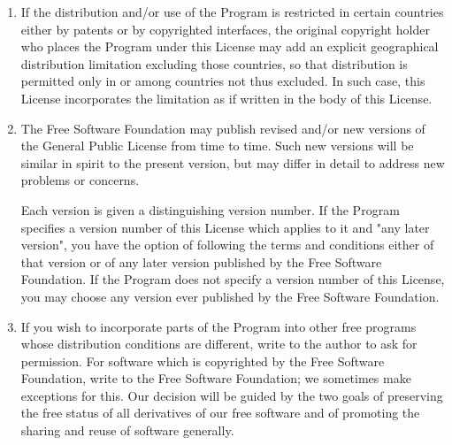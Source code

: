 {\begin{enumerate}
If any portion of this section is held invalid or unenforceable under
any particular circumstance, the balance of the section is intended to
apply and the section as a whole is intended to apply in other
circumstances.

It is not the purpose of this section to induce you to infringe any
patents or other property right claims or to contest validity of any
such claims; this section has the sole purpose of protecting the
integrity of the free software distribution system, which is
implemented by public license practices.  Many people have made
generous contributions to the wide range of software distributed
through that system in reliance on consistent application of that
system; it is up to the author/donor to decide if he or she is willing
to distribute software through any other system and a licensee cannot
impose that choice.

This section is intended to make thoroughly clear what is believed to
be a consequence of the rest of this License.

\item If the distribution and/or use of the Program is restricted in
certain countries either by patents or by copyrighted interfaces, the
original copyright holder who places the Program under this License
may add an explicit geographical distribution limitation excluding
those countries, so that distribution is permitted only in or among
countries not thus excluded.  In such case, this License incorporates
the limitation as if written in the body of this License.

\item The Free Software Foundation may publish revised and/or new versions
of the General Public License from time to time.  Such new versions will
be similar in spirit to the present version, but may differ in detail to
address new problems or concerns.

Each version is given a distinguishing version number.  If the Program
specifies a version number of this License which applies to it and "any
later version", you have the option of following the terms and conditions
either of that version or of any later version published by the Free
Software Foundation.  If the Program does not specify a version number of
this License, you may choose any version ever published by the Free Software
Foundation.

\item If you wish to incorporate parts of the Program into other free
programs whose distribution conditions are different, write to the author
to ask for permission.  For software which is copyrighted by the Free
Software Foundation, write to the Free Software Foundation; we sometimes
make exceptions for this.  Our decision will be guided by the two goals
of preserving the free status of all derivatives of our free software and
of promoting the sharing and reuse of software generally.


\end{enumerate}}
